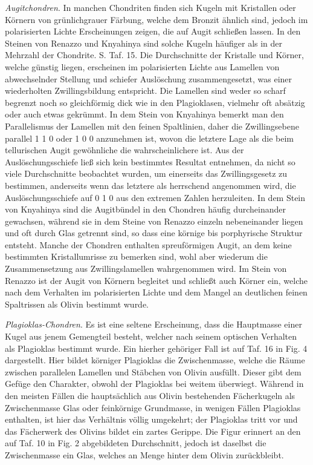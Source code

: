 \documentclass[a4paper, 11pt, oneside, polutonikogreek, german]{article}
\begin{document}
\emph{Augitchondren}. In manchen Chondriten finden sich Kugeln mit Kristallen oder Körnern von grünlichgrauer Färbung, welche dem Bronzit ähnlich sind, jedoch im polarisierten Lichte Erscheinungen zeigen, die auf Augit schließen lassen. In den Steinen von Renazzo und Knyahinya sind solche Kugeln häufiger als in der Mehrzahl der Chondrite. S. Taf. 15. Die Durchschnitte der Kristalle und Körner, welche günstig liegen, erscheinen im polarisierten Lichte aus Lamellen von abwechselnder Stellung und schiefer Auslöschung zusammengesetzt, was einer wiederholten Zwillingsbildung entspricht. Die Lamellen sind weder so scharf begrenzt noch so gleichförmig dick wie in den Plagioklasen, vielmehr oft absätzig oder auch etwas gekrümmt. In dem Stein von Knyahinya bemerkt man den Parallelismus der Lamellen mit den feinen Spaltlinien, daher die Zwillingsebene parallel 1 1 0 oder 1 0 0 anzunehmen ist, wovon die letztere Lage als die beim tellurischen Augit gewöhnliche die wahrscheinlichere ist. Aus der Auslöschungsschiefe ließ sich kein bestimmtes Resultat entnehmen, da nicht so viele Durchschnitte beobachtet wurden, um einerseits das Zwillingsgesetz zu bestimmen, anderseits wenn das letztere als herrschend angenommen wird, die Auslöschungsschiefe auf 0 1 0 aus den extremen Zahlen herzuleiten. In dem Stein von Knyahinya sind die Augitbündel in den Chondren häufig durcheinander gewachsen, während sie in dem Steine von Renazzo einzeln nebeneinander liegen und oft durch Glas getrennt sind, so dass eine körnige bis porphyrische Struktur entsteht. Manche der Chondren enthalten spreuförmigen Augit, an dem keine bestimmten Kristallumrisse zu bemerken sind, wohl aber wiederum die Zusammensetzung aus Zwillingslamellen wahrgenommen wird. Im Stein von Renazzo ist der Augit von Körnern begleitet und schließt auch Körner ein, welche nach dem Verhalten im polarisierten Lichte und dem Mangel an deutlichen feinen Spaltrissen als Olivin bestimmt wurde.

\emph{Plagioklas-Chondren}. Es ist eine seltene Erscheinung, dass die Hauptmasse einer Kugel aus jenem Gemengteil besteht, welcher nach seinem optischen Verhalten als Plagioklas bestimmt wurde. Ein hierher gehöriger Fall ist auf Taf. 16 in Fig. 4 dargestellt. Hier bildet körniger Plagioklas die Zwischenmasse, welche die Räume zwischen parallelen Lamellen und Stäbchen von Olivin ausfüllt. Dieser gibt dem Gefüge den Charakter, obwohl der Plagioklas bei weitem überwiegt. Während in den meisten Fällen die hauptsächlich aus Olivin bestehenden Fächerkugeln als Zwischenmasse Glas oder feinkörnige Grundmasse, in wenigen Fällen Plagioklas enthalten, ist hier das Verhältnis völlig umgekehrt; der Plagioklas tritt vor und das Fächerwerk des Olivins bildet ein zartes Gerippe. Die Figur erinnert an den auf Taf. 10 in Fig. 2 abgebildeten Durchschnitt, jedoch ist daselbst die Zwischenmasse ein Glas, welches an Menge hinter dem Olivin zurückbleibt.
\end{document}
